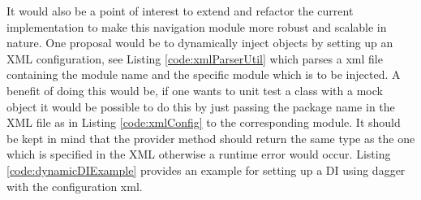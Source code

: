     It would also be a point of interest to extend and refactor the
    current implementation to make this navigation 
    module more robust and 
    scalable in nature.
    One proposal would be to dynamically inject objects by setting up an 
    XML configuration, see Listing \ref{code:xmlParserUtil}  which
    parses a xml file containing the module name and the specific module
    which is to be injected. A benefit of doing this would be, if one wants
    to unit test a class with a mock object it would be possible to do this
    by just passing the package name in the XML file as in 
    Listing \ref{code:xmlConfig} to the 
    corresponding module. It should be kept in mind that the provider
    method should return the same type as the one which is specified
    in the XML otherwise a runtime error would occur. 
    Listing \ref{code:dynamicDIExample} provides an example for setting up 
    a DI using dagger with the configuration xml.  

    
    
        